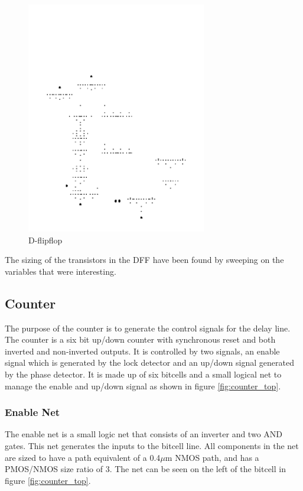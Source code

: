 \documentclass[a4paper,12pt]{article} \usepackage{graphicx}
\begin{document}
\begin{figure}[h]
\centering
\includegraphics[width=0.7\textwidth, angle = 270]{../Bilder/DFF-1.png}
\caption{D-flipflop}
\label{fig:DFF}
\end{figure}

The sizing of the transistors in the DFF have been found by sweeping on the variables that were interesting.

\clearpage

\subsection{Counter}
The purpose of the counter is to generate the control signals for the delay line.
The counter is a six bit up/down counter with synchronous reset and both
inverted and non-inverted outputs. It is controlled by two signals, an enable
signal which is generated by the lock detector and an up/down signal generated
by the phase detector. It is made up of six bitcells and a small logical net to
manage the enable and up/down signal as shown in figure \ref{fig:counter_top}.



\subsubsection{Enable Net}
The enable net is a small logic net that consists of an inverter and two
AND gates. This net generates the inputs to the bitcell line.
All components in the net are sized to have a path equivalent of a 0.4$\mu$m NMOS
path, and has a PMOS/NMOS size ratio of 3. The net can be seen on the left of the
bitcell in figure \ref{fig:counter_top}.
\end{document}
